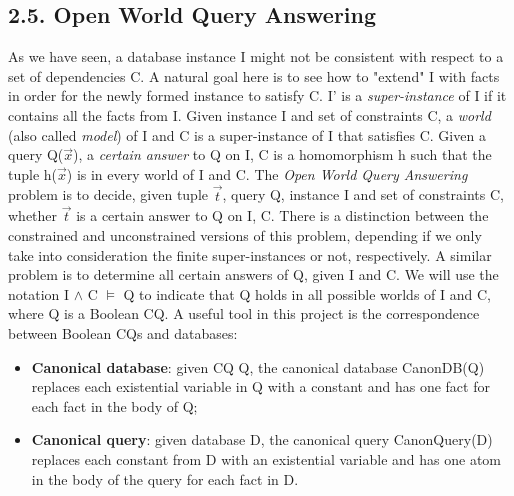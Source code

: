 \documentclass[11pt, a4paper, dvipsnames]{article}
\begin{document}
\subsection{2.5. Open World Query Answering}
As we have seen, a database instance I might not be consistent with respect to a set of dependencies C. A natural goal here is to see how to "extend" I with facts in order for the newly formed instance to satisfy C.\newline
I' is a \textit{super-instance} of I if it contains all the facts from I.  Given instance I and set of constraints C, a \textit{world} (also called \textit{model}) of I and C is a super-instance of I that satisfies C. Given a query Q($\vec{x}$), a \textit{certain answer} to Q on I, C is a homomorphism h such that the tuple h($\vec{x}$) is in every world of I and C. \newline
The \textit{Open World Query Answering} problem is to decide, given tuple $\vec{t}$, query Q, instance I and set of constraints C, whether $\vec{t}$ is a certain answer to Q on I, C. There is a distinction between the constrained and unconstrained versions of this problem, depending if we only take into consideration the finite super-instances or not, respectively. A similar problem is to determine all certain answers of Q, given I and C.\newline
We will use the notation I $\wedge$ C $\vDash$ Q to indicate that Q holds in all possible worlds of I and C, where Q is a Boolean CQ.\newline
A useful tool in this project is the correspondence between Boolean CQs and databases:
\begin{itemize}
	\item \textbf{Canonical database}: given CQ Q, the canonical database CanonDB(Q) replaces each existential variable in Q with a constant and has one fact for each fact in the body of Q;
	\item \textbf{Canonical query}: given database D, the canonical query CanonQuery(D) replaces each constant from D with an existential variable and has one atom in the body of the query for each fact in D.
\end{itemize}
\end{document}
